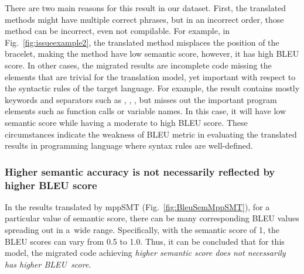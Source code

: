 There are two main reasons for this result in our dataset.  First, the
translated methods might have multiple correct phrases, but in an
incorrect order, those method can be incorrect, even not compilable.
%
For example, in Fig.~\ref{fig:issueexample2}, the translated method
misplaces the position of the bracelet, making the method have low
semantic score, however, it has high BLEU score.
%
In other cases, the migrated results are incomplete code missing the
elements that are trivial for the translation model, yet important
with respect to the syntactic rules of the target language. For
example, the result contains mostly keywords and separators such as
, , \code{()}, but misses out the important
program elements such as function calls or variable names. In this
case, it will have low semantic score while having a moderate to high
BLEU score. These circumstances indicate the weakness of BLEU metric
in evaluating the translated results in programming language where
syntax rules are well-defined.


\subsubsection{{\bf Higher semantic accuracy is not necessarily reflected by
higher BLEU score}} In the results translated by mppSMT
(Fig.~\ref{fig:BleuSemMppSMT}), for a particular value of semantic
score, there can be many corresponding BLEU values spreading out in
a~wide range. Specifically, with the semantic score of 1, the BLEU
scores can vary from 0.5 to 1.0. Thus, it can be concluded
that for this model, the migrated code achieving {\em higher semantic score does not necessarily has higher BLEU~score}.

